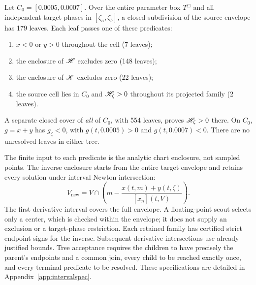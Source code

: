 \begin{certificate}\label{cert:cover}
Let \(C_0=[0.0005,0.0007]\). Over the entire parameter box \(T^\Box\)
and all independent target phases in \([\zeta_a,\zeta_b]\), a closed
subdivision of the source envelope has 179 leaves. Each leaf passes one
of these predicates:
\begin{enumerate}
\item \(x<0\) or \(y>0\) throughout the cell (7 leaves);
\item the enclosure of \(\mathscr H\) excludes zero (148 leaves);
\item the enclosure of \(\mathscr K\) excludes zero (22 leaves);
\item the source cell lies in \(C_0\) and \(\mathscr H_\zeta>0\)
throughout its projected family (2 leaves).
\end{enumerate}
A separate closed cover of \emph{all} of \(C_0\), with 554 leaves,
proves \(\mathscr H_\zeta>0\) there. On \(C_0\), \(g=x+y\) has
\(g_\zeta<0\), with \(g(t,0.0005)>0\) and \(g(t,0.0007)<0\).
There are no unresolved leaves in either tree.
\end{certificate}

The finite input to each predicate is the analytic chart enclosure, not
sampled points. The inverse enclosure starts from the entire target
envelope and retains every solution under interval Newton intersection:
\[
 V_{\mathrm{new}}
 =V\cap\left(m-\frac{x(t,m)+y(t,\zeta)}{[x_\eta](t,V)}\right).
\]
The first derivative interval covers the full envelope. A floating-point
scout selects only a center, which is checked within the envelope; it does
not supply an exclusion or a target-phase restriction. Each retained
family has certified strict endpoint signs for the inverse. Subsequent
derivative intersections use already justified bounds. Tree acceptance
requires the children to have precisely the parent's endpoints and a
common join, every child to be reached exactly once, and every terminal
predicate to be resolved. These specifications are detailed in
Appendix~\ref{app:intervalspec}.

